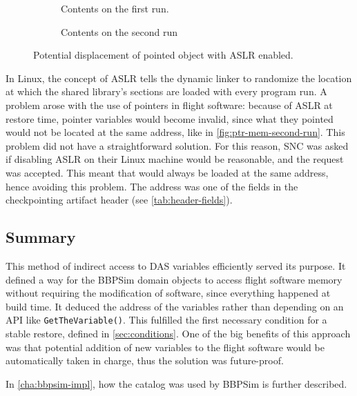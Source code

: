 {\begin{figure}[htbp]
	\centering
	\begin{subfigure}[t]{.58\linewidth}
		\small
		\centering
		
		\caption{Contents on the first run.}
		\label{fig:ptr-mem-first-run}
	\end{subfigure}%
	\begin{subfigure}[t]{.38\linewidth}
		\small
		\centering
		
		\caption{Contents on the second run}
		\label{fig:ptr-mem-second-run}
	\end{subfigure}
	\caption{Potential displacement of pointed object with ASLR enabled.}
	\label{fig:mem-displacement}
\end{figure}

In Linux, the concept of \gls{ASLR} tells the dynamic linker to randomize the location at which the shared library's sections are loaded with every program run. A problem arose with the use of pointers in flight software: because of ASLR at restore time, pointer variables would become invalid, since what they pointed would not be located at the same address, like in  \autoref{fig:ptr-mem-second-run}. This problem did not have a straightforward solution. For this reason, \gls{SNC} was asked if disabling \gls{ASLR} on their Linux machine would be reasonable, and the request was accepted. This meant that  would always be loaded at the same address, hence avoiding this problem. The address was one of the fields in the checkpointing artifact header (see \autoref{tab:header-fields}).

\subsection*{Summary}
This method of indirect access to DAS variables efficiently served its purpose. It defined a way for the BBPSim domain objects to access flight software memory without requiring the modification of software, since everything happened at build time. It deduced the address of the variables rather than depending on an API like \texttt{GetTheVariable()}. This fulfilled the first necessary condition for a stable restore, defined in \autoref{sec:conditions}. One of the big benefits of this approach was that potential addition of new variables to the flight software would be automatically taken in charge, thus the solution was future-proof.

In \autoref{cha:bbpsim-impl}, how the catalog was used by \gls{BBPSim} is further described.
}